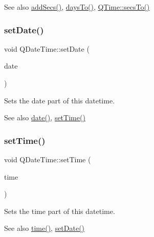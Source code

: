 \begin{DoxySeeAlso}{See also}
\mbox{\hyperlink{class_q_date_time_a7b48ae870775460aec8791465c2e5056}{add\+Secs()}}, \mbox{\hyperlink{class_q_date_time_a80a194c8ecef4133a9bff3aeb4546934}{days\+To()}}, \mbox{\hyperlink{class_q_time_a8193498cc40d7386b23df740fa326b2b}{Q\+Time\+::secs\+To()}} 
\end{DoxySeeAlso}
\mbox{\label{class_q_date_time_aba938ae7007f881a6a641bbdb3ac634a}} 
\subsubsection{\texorpdfstring{setDate()}{setDate()}}
{\footnotesize\ttfamily void Q\+Date\+Time\+::set\+Date (\begin{DoxyParamCaption}\item[{const \mbox{\hyperlink{class_q_date}{Q\+Date}} \&}]{date }\end{DoxyParamCaption})\hspace{0.3cm}{\ttfamily [inline]}}

Sets the date part of this datetime.

\begin{DoxySeeAlso}{See also}
\mbox{\hyperlink{class_q_date_time_ae7d86dc9b95e2aeab38391033eeff9eb}{date()}}, \mbox{\hyperlink{class_q_date_time_a6384cf8a49551d5e42786ab850894813}{set\+Time()}} 
\end{DoxySeeAlso}
\mbox{\label{class_q_date_time_a6384cf8a49551d5e42786ab850894813}} 
\subsubsection{\texorpdfstring{setTime()}{setTime()}}
{\footnotesize\ttfamily void Q\+Date\+Time\+::set\+Time (\begin{DoxyParamCaption}\item[{const \mbox{\hyperlink{class_q_time}{Q\+Time}} \&}]{time }\end{DoxyParamCaption})\hspace{0.3cm}{\ttfamily [inline]}}

Sets the time part of this datetime.

\begin{DoxySeeAlso}{See also}
\mbox{\hyperlink{class_q_date_time_a7b8eefbd04093747deb22f5cd6b673c1}{time()}}, \mbox{\hyperlink{class_q_date_time_aba938ae7007f881a6a641bbdb3ac634a}{set\+Date()}} 
\end{DoxySeeAlso}
\mbox{\label{class_q_date_time_a889dac98cb29b4b9f33cfea6f00db98b}} 
